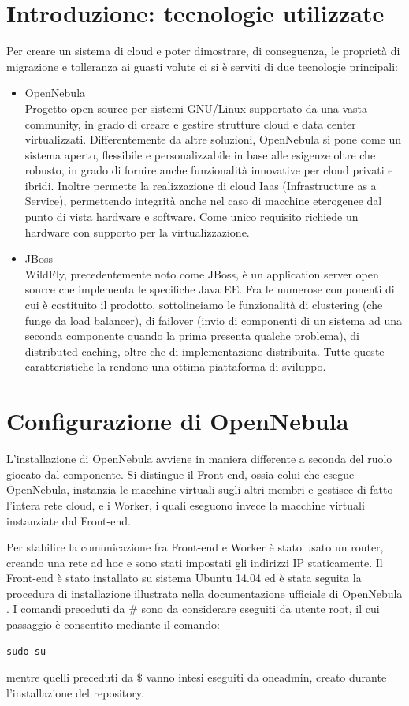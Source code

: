 \documentclass[twoside]{article}
\begin{document}
\section{Introduzione: tecnologie utilizzate}
Per creare un sistema di cloud e poter dimostrare, di conseguenza, le proprietà di migrazione e
tolleranza ai guasti volute ci si è serviti di due tecnologie principali:
\begin{itemize}
	\item OpenNebula \cite{bib:opennebula2} \\
		  Progetto open source per sistemi GNU/Linux supportato da una vasta community, in grado di
		  creare e gestire strutture cloud e data center virtualizzati. Differentemente da altre soluzioni,
		  OpenNebula si pone come un sistema aperto, flessibile e personalizzabile in base alle esigenze
		  oltre che robusto, in grado di fornire anche funzionalità innovative per cloud privati e ibridi.
		  Inoltre permette la realizzazione di cloud Iaas (Infrastructure as a Service), permettendo integrità
		  anche nel caso di macchine eterogenee dal punto di vista hardware e software. Come unico requisito
		  richiede un hardware con supporto per la virtualizzazione.
	\item JBoss \cite{bib:jboss2} \\
		  WildFly, precedentemente noto come JBoss, è un application server open source che implementa
		  le specifiche Java EE. Fra le numerose componenti di cui è costituito il prodotto, sottolineiamo
		  le funzionalità di clustering (che funge da load balancer), di failover (invio di componenti di
		  un sistema ad una seconda componente quando la prima presenta qualche problema), di distributed
		  caching, oltre che di implementazione distribuita. Tutte queste caratteristiche la rendono una
		  ottima piattaforma di sviluppo.
\end{itemize}

\section{Configurazione di OpenNebula}
L'installazione di OpenNebula avviene in maniera differente a seconda del ruolo giocato dal componente.
Si distingue il Front-end, ossia colui che esegue OpenNebula, instanzia le macchine virtuali sugli altri
membri e gestisce di fatto l'intera rete cloud, e i Worker, i quali eseguono invece la macchine virtuali
instanziate dal Front-end.

Per stabilire la comunicazione fra Front-end e Worker è stato usato un router, creando una rete ad hoc 
e sono stati impostati gli indirizzi IP staticamente.
Il Front-end è stato installato su sistema Ubuntu 14.04 ed è stata seguita
la procedura di installazione illustrata nella documentazione ufficiale di OpenNebula \cite{bib:opennebula}.
I comandi preceduti da \# sono da considerare eseguiti da utente root, il cui passaggio è consentito
mediante il comando:
\begin{lstlisting}[frame=trBL]
sudo su
\end{lstlisting}
mentre quelli preceduti da \$ vanno intesi eseguiti da oneadmin, creato durante l'installazione del
repository.
\end{document}
